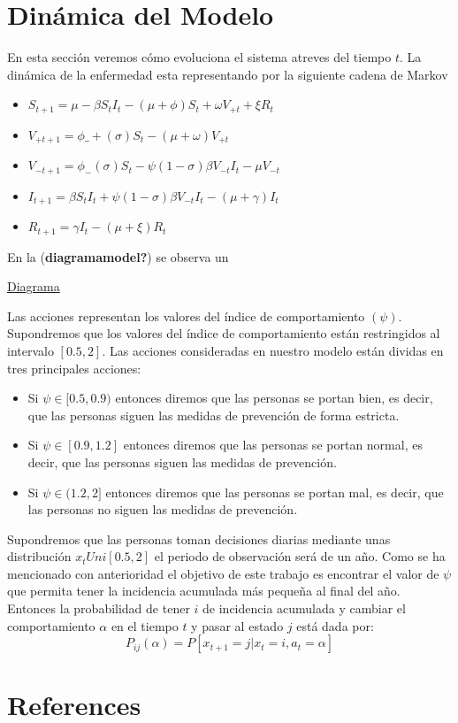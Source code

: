 \documentclass[
  letterpaper,
  DIV=11,
  numbers=noendperiod]{scrreprt}
\newlength{\cslhangindent}
\newenvironment{CSLReferences}[2] %
 {\begin{list}{}{%
  \setlength{\itemindent}{0pt}
  \setlength{\leftmargin}{0pt}
  \setlength{\parsep}{0pt}
  \ifodd #1
   \setlength{\leftmargin}{\cslhangindent}
   \setlength{\itemindent}{-1\cslhangindent}
  \fi
  \setlength{\itemsep}{#2\baselineskip}}}
 {\end{list}}
\begin{document}

\chapter{Dinámica del Modelo}\label{dinuxe1mica-del-modelo}

En esta sección veremos cómo evoluciona el sistema atreves del tiempo
\(t\). La dinámica de la enfermedad esta representando por la siguiente
cadena de Markov

\begin{itemize}
\item
  \(S_{t+1}= \mu -\beta S_{t}I_{t}- (\mu + \phi)S_{t}+\omega V_{+t}+\xi R_{t}\)
\item
  \(V_{+t+1}= \phi\_{+}(\sigma)S_{t}-(\mu+\omega) V_{+t}\)
\item
  \(V_{-t+1}=\phi_{-}(\sigma)S_{t}- \psi(1-\sigma) \beta V_{-t} I_{t}-\mu V_{-t}\)
\item
  \(I_{t+1}= \beta S_{t}I_{t}+\psi(1-\sigma) \beta V_{-t} I_{t} -(\mu+ \gamma)I_{t}\)
\item
  \(R_{t+1}=\gamma I_{t}-(\mu +\xi) R_{t}\)
\end{itemize}

En la (\textbf{diagramamodel?}) se observa un

\label{diagramamodel}\href{EstadosSVVIRS.JPG}{Diagrama}

Las acciones representan los valores del índice de comportamiento
\((\psi)\). Supondremos que los valores del índice de comportamiento
están restringidos al intervalo \([0.5,2]\). Las acciones consideradas
en nuestro modelo están dividas en tres principales acciones:

\begin{itemize}
\item
  Si \(\psi\in [0.5,0.9)\) entonces diremos que las personas se portan
  bien, es decir, que las personas siguen las medidas de prevención de
  forma estricta.
\item
  Si \(\psi\in [0.9,1.2]\) entonces diremos que las personas se portan
  normal, es decir, que las personas siguen las medidas de prevención.
\item
  Si \(\psi\in (1.2,2]\) entonces diremos que las personas se portan
  mal, es decir, que las personas no siguen las medidas de prevención.
\end{itemize}

Supondremos que las personas toman decisiones diarias mediante unas
distribución \(x_{t} Uni[0.5,2]\) el periodo de observación será de un
año. Como se ha mencionado con anterioridad el objetivo de este trabajo
es encontrar el valor de \(\psi\) que permita tener la incidencia
acumulada más pequeña al final del año. Entonces la probabilidad de
tener \(i\) de incidencia acumulada y cambiar el comportamiento
\(\alpha\) en el tiempo \(t\) y pasar al estado \(j\) está dada por:
\[P_{ij}(\alpha)=P[x_{t+1}=j|x_{t}=i,a_{t}=\alpha]\]


\chapter*{References}\label{references}


\label{refs}
\begin{CSLReferences}{0}{1}
\end{CSLReferences}
\end{document}
